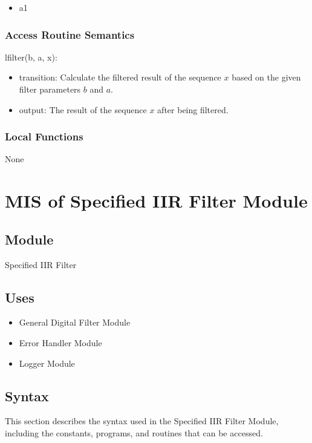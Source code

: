 \documentclass[12pt, titlepage]{article}
\begin{document}
\begin{itemize}
\item a1
\end{itemize}

\subsubsection{Access Routine Semantics}

\noindent lfilter(b, a, x):
\begin{itemize}
\item transition: Calculate the filtered result of the sequence $x$ based on the
given filter parameters $b$ and $a$.
\item output: The result of the sequence $x$ after being filtered.
\end{itemize}

\subsubsection{Local Functions}

None

\newpage

\section{MIS of Specified IIR Filter Module} \label{MIS_SIIR}

\subsection{Module}

Specified IIR Filter

\subsection{Uses}

\begin{itemize}
\item General Digital Filter Module
\item Error Handler Module
\item Logger Module
\end{itemize}

\subsection{Syntax}

This section describes the syntax used in the Specified IIR Filter Module,
including the constants, programs, and routines that can be accessed.
\end{document}
